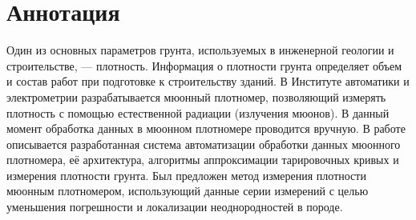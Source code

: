 \thispagestyle{empty}
\chapter*{Аннотация}

Один из основных параметров грунта, используемых в инженерной геологии и строительстве, ---
плотность. Информация о плотности грунта 
определяет объем и состав работ при подготовке к строительству зданий. В Институте автоматики и электрометрии разрабатывается мюонный плотномер, позволяющий измерять плотность с помощью естественной радиации (излучения мюонов). В данный момент обработка данных в мюонном плотномере проводится вручную. В работе описывается разработанная система автоматизации обработки данных мюонного плотномера, её архитектура, алгоритмы аппроксимации тарировочных кривых и измерения плотности грунта. Был предложен метод измерения плотности мюонным плотномером, использующий данные серии измерений с целью уменьшения погрешности и локализации неоднородностей в породе.

\clearpage